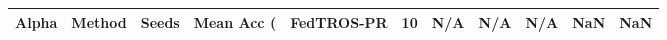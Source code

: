 \begin{tabular}{rlrlllrr}
\toprule
Alpha & Method & Seeds & Mean Acc (%
 & FedTROS-PR & 10 & N/A & N/A & N/A & NaN & NaN \\
\bottomrule
\end{tabular}
